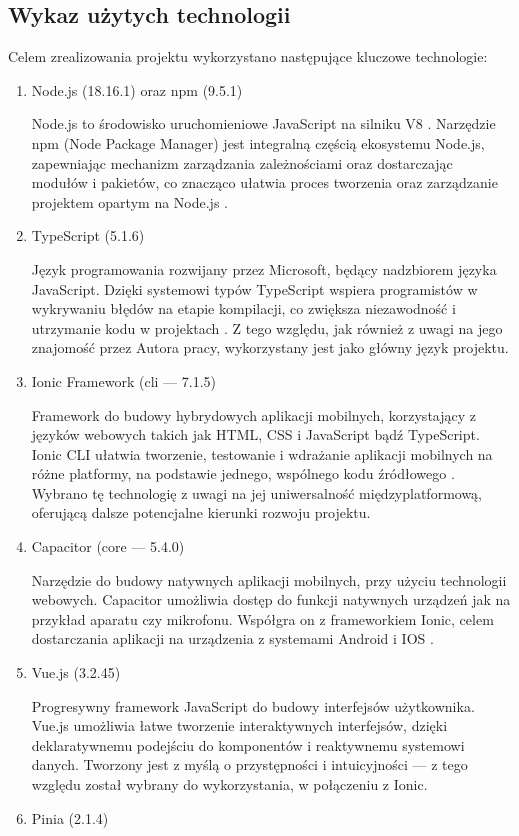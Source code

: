 \subsection{Wykaz użytych technologii}
Celem zrealizowania projektu wykorzystano następujące kluczowe technologie:
\begin{enumerate}
	\item Node.js (18.16.1) oraz npm (9.5.1)

	      Node.js to środowisko uruchomieniowe JavaScript na silniku V8 \cite{node}.
	      Narzędzie npm (Node Package Manager) jest integralną częścią ekosystemu Node.js,
	      zapewniając mechanizm zarządzania zależnościami oraz dostarczając modułów i pakietów,
	      co znacząco ułatwia proces tworzenia oraz zarządzanie projektem opartym na Node.js \cite{npm}.
	\item TypeScript (5.1.6)

	      Język programowania rozwijany przez Microsoft, będący nadzbiorem języka JavaScript.
	      Dzięki systemowi typów TypeScript wspiera programistów w wykrywaniu błędów na etapie kompilacji,
	      co zwiększa niezawodność i utrzymanie kodu w projektach \cite{ts}.
	      Z tego względu, jak również z uwagi na jego znajomość
	      przez Autora pracy, wykorzystany jest jako główny język projektu.
	\item Ionic Framework (cli — 7.1.5)

	      Framework do budowy hybrydowych aplikacji mobilnych, korzystający z języków webowych takich jak HTML,
	      CSS i JavaScript bądź TypeScript.
	      Ionic CLI ułatwia tworzenie, testowanie i wdrażanie aplikacji mobilnych na różne platformy, na podstawie jednego,
	      wspólnego kodu źródłowego \cite{ionic}.
	      Wybrano tę technologię z uwagi na jej uniwersalność międzyplatformową, oferującą dalsze potencjalne kierunki
	      rozwoju projektu.
	\item Capacitor (core — 5.4.0)

	      Narzędzie do budowy natywnych aplikacji mobilnych, przy użyciu technologii webowych.
	      Capacitor umożliwia dostęp do funkcji natywnych urządzeń jak na przykład aparatu czy mikrofonu.
	      Współgra on z frameworkiem Ionic, celem dostarczania aplikacji na urządzenia z systemami Android i IOS \cite{capacitor}.
	\item Vue.js (3.2.45)

	      Progresywny framework JavaScript do budowy interfejsów użytkownika.
	      Vue.js umożliwia łatwe tworzenie interaktywnych interfejsów, dzięki deklaratywnemu podejściu do komponentów i
	      reaktywnemu systemowi danych. Tworzony jest z myślą o przystępności i intuicyjności \cite{vue}
	      — z tego względu został wybrany do wykorzystania, w połączeniu z Ionic.
	\item Pinia (2.1.4)


\end{enumerate}
